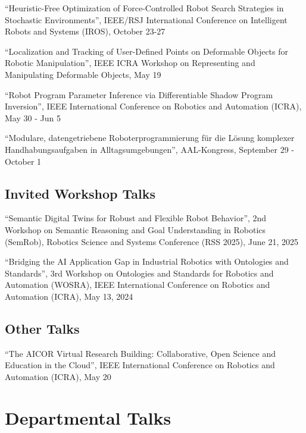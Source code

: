 \documentclass[11pt]{article} %
\begin{document}
\medskip

``Heuristic-Free Optimization of Force-Controlled Robot Search Strategies in Stochastic Environments'', IEEE/RSJ International Conference on Intelligent Robots and Systems (IROS), October 23-27

\medskip

``Localization and Tracking of User-Defined Points on Deformable Objects for Robotic Manipulation'', IEEE ICRA Workshop on Representing and Manipulating Deformable Objects, May 19

\medskip

``Robot Program Parameter Inference via Differentiable Shadow Program Inversion'', IEEE International Conference on Robotics and Automation (ICRA), May 30 - Jun 5

\medskip


``Modulare, datengetriebene Roboterprogrammierung für die Lösung komplexer Handhabungsaufgaben in Alltagsumgebungen'', AAL-Kongress, September 29 - October 1

\subsection*{Invited Workshop Talks}

``Semantic Digital Twins for Robust and Flexible Robot Behavior'', 2nd Workshop on Semantic Reasoning and Goal Understanding in Robotics (SemRob), Robotics Science and Systems Conference (RSS 2025), June 21, 2025 

\medskip

``Bridging the AI Application Gap in Industrial Robotics with Ontologies and Standards'', 3rd Workshop on Ontologies and Standards for Robotics and Automation (WOSRA), IEEE International Conference on Robotics and Automation (ICRA), May 13, 2024

\subsection*{Other Talks}


``The AICOR Virtual Research Building: Collaborative, Open Science and Education in the Cloud'', IEEE International Conference on Robotics and Automation (ICRA), May 20

\section*{Departmental Talks}
\end{document}
